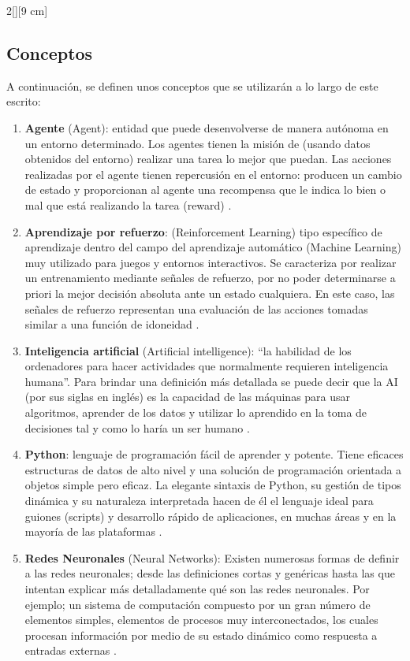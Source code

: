\documentclass[letterpaper, 10 pt]{article}
\begin{document}
\begin{multicols}{2}[][9 cm]
\subsection{Conceptos}
A continuación, se definen unos conceptos que se utilizarán a lo largo de este escrito:
\begin{enumerate}
	\item  \textbf{Agente} (Agent):  entidad que puede desenvolverse de manera autónoma en un entorno determinado. Los agentes tienen la misión de (usando datos obtenidos del entorno) realizar una tarea lo mejor que puedan. Las acciones realizadas por el agente tienen repercusión en el entorno: producen un cambio de estado y proporcionan al agente una recompensa que le indica lo bien o mal que está realizando la tarea (reward) \citep{fernandez2016ajustando}.
	\item  \textbf{Aprendizaje por refuerzo}: (Reinforcement Learning)  tipo específico de aprendizaje dentro del campo del aprendizaje automático (Machine Learning) muy utilizado para juegos y entornos interactivos. Se caracteriza por realizar un entrenamiento mediante señales de refuerzo, por no poder determinarse a priori la mejor decisión absoluta ante un estado cualquiera. En este caso, las señales de refuerzo representan una evaluación de las acciones tomadas similar a una función de idoneidad \citep{fernandez2016ajustando}.
	\item  \textbf{Inteligencia artificial} (Artificial intelligence): “la habilidad de los ordenadores para hacer actividades que normalmente requieren inteligencia humana”. Para brindar una definición más detallada se puede decir que la AI (por sus siglas en inglés) es la capacidad de las máquinas para usar algoritmos, aprender de los datos y utilizar lo aprendido en la toma de decisiones tal y como lo haría un ser humano \cite{rouhiainen2018inteligencia}. 
	\item  \textbf{Python}: lenguaje de programación fácil de aprender y potente. Tiene eficaces estructuras de datos de alto nivel y una solución de programación orientada a objetos simple pero eficaz. La elegante sintaxis de Python, su gestión de tipos dinámica y su naturaleza interpretada hacen de él el lenguaje ideal para guiones (scripts) y desarrollo rápido de aplicaciones, en muchas áreas y en la mayoría de las plataformas \cite{van1991guia}.
	\item  \textbf{Redes Neuronales} (Neural Networks):  Existen numerosas formas de definir a las redes neuronales; desde las definiciones cortas y genéricas hasta las que intentan explicar más detalladamente qué son las redes neuronales. Por ejemplo; un sistema de computación compuesto por un gran número de elementos simples, elementos de procesos muy interconectados, los cuales procesan información por medio de su estado dinámico como respuesta a entradas externas \cite{matich2001redes}.

\end{enumerate}
\end{multicols}
\end{document}
